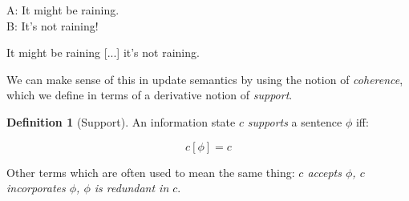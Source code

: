 \documentclass[nols,twoside,nofonts,nobib,nohyper]{tufte-handout}
\theoremstyle{definition}
\newtheorem{definition}{Definition}[section]
\begin{document}
\ex
A: It might be raining.\\
B: It's not raining!
\xe

\ex
It might be raining [...] it's not raining.
\xe

We can make sense of this in update semantics by using the notion of \textit{coherence}, which we define in terms of a derivative notion of \textit{support}.

\begin{definition}[Support]
  An information state $c$ \textit{supports} a sentence $ϕ$ iff:

  $$c[ϕ] = c$$

  Other terms which are often used to mean the same thing: \textit{$c$ accepts $\phi$, $c$ incorporates $\phi$, $ϕ$ is redundant in $c$}.
\end{definition}
\end{document}
